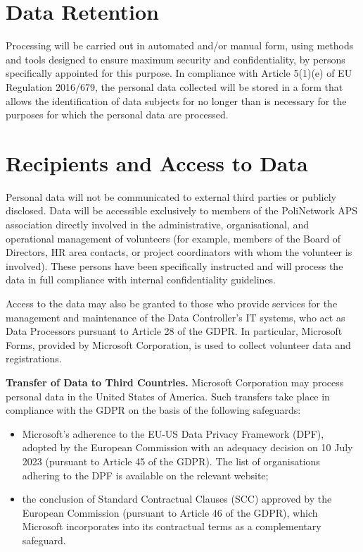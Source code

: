 \documentclass[legal]{polinetwork}
\begin{document}
\section{Data Retention}

Processing will be carried out in automated and/or manual form, using methods and tools designed to ensure maximum security and confidentiality, by persons specifically appointed for this purpose. In compliance with Article 5(1)(e) of EU Regulation 2016/679, the personal data collected will be stored in a form that allows the identification of data subjects for no longer than is necessary for the purposes for which the personal data are processed.

\section{Recipients and Access to Data}

Personal data will not be communicated to external third parties or publicly disclosed. Data will be accessible exclusively to members of the PoliNetwork APS association directly involved in the administrative, organisational, and operational management of volunteers (for example, members of the Board of Directors, HR area contacts, or project coordinators with whom the volunteer is involved). These persons have been specifically instructed and will process the data in full compliance with internal confidentiality guidelines.

Access to the data may also be granted to those who provide services for the management and maintenance of the Data Controller’s IT systems, who act as Data Processors pursuant to Article 28 of the GDPR. In particular, Microsoft Forms, provided by Microsoft Corporation, is used to collect volunteer data and registrations.

\textbf{Transfer of Data to Third Countries.} Microsoft Corporation may process personal data in the United States of America. Such transfers take place in compliance with the GDPR on the basis of the following safeguards:

\begin{itemize}
	\item Microsoft’s adherence to the EU-US Data Privacy Framework (DPF), adopted by the European Commission with an adequacy decision on 10 July 2023 (pursuant to Article 45 of the GDPR). The list of organisations adhering to the DPF is available on the relevant website;
	\item the conclusion of Standard Contractual Clauses (SCC) approved by the European Commission (pursuant to Article 46 of the GDPR), which Microsoft incorporates into its contractual terms as a complementary safeguard.
\end{itemize}
\end{document}

